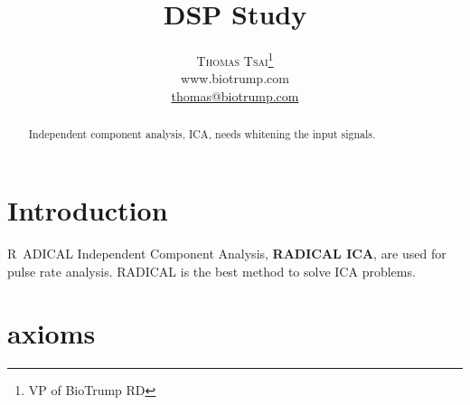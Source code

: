 \documentclass[a4paper,12pt]{article}
\title{\vspace{-15mm}\fontsize{24pt}{10pt}\selectfont\textbf{DSP Study}} %
\author{
\large
\textsc{Thomas Tsai}\thanks{VP of BioTrump RD}\\[2mm] %
\normalsize www.biotrump.com \\ %
\normalsize \href{mailto:thomas@biotrump.com}{thomas@biotrump.com} %
\vspace{-5mm}
}
\date{}
\begin{document}
\maketitle %

\thispagestyle{fancy} %


\begin{abstract}

Independent component analysis, ICA, needs whitening the input signals.

\end{abstract}



\section{Introduction}

\lettrine[nindent=0em,lines=3]{R}\ ADICAL Independent Component Analysis, \textbf{RADICAL ICA},
\cite{radical-ica} are used for pulse rate analysis.
RADICAL is the best method to solve ICA problems.


\section{axioms}
\end{document}
